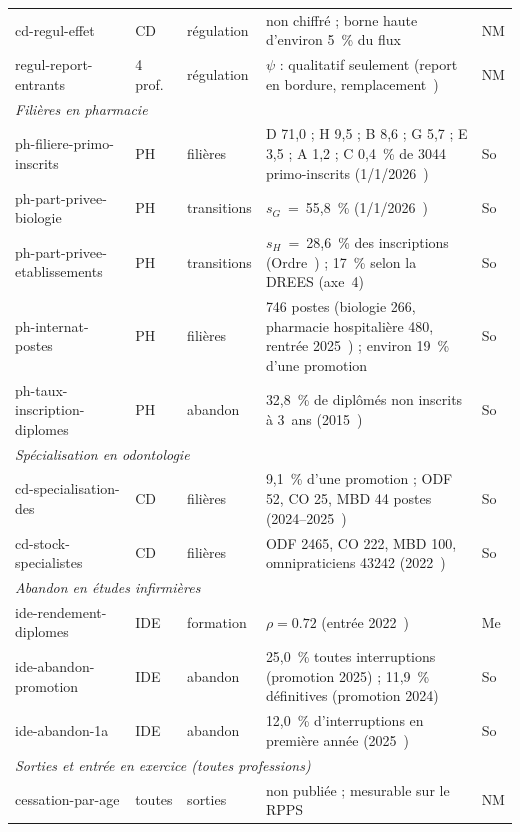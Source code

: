 \documentclass[11pt]{article}
\begin{document}
\begin{table}[p]
\begin{tabular}{p{2.6cm}p{1.1cm}p{1.6cm}p{6.6cm}p{0.5cm}}
cd-regul-effet & CD & régulation & non chiffré ; borne haute d'environ 5~\%\derive{} du flux & NM \\
regul-report-entrants & 4 prof. & régulation & $\psi$ : qualitatif seulement (report en bordure, remplacement~\cite{irdes270,ccomptes2024}) & NM \\
\midrule
\multicolumn{5}{l}{\emph{Filières en pharmacie}} \\
ph-filiere-primo-inscrits & PH & filières & D 71,0 ; H 9,5 ; B 8,6 ; G 5,7 ; E 3,5 ; A 1,2 ; C 0,4~\% de \num{3044} primo-inscrits (1/1/2026~\cite{cnop2025}) & So \\
ph-part-privee-biologie & PH & transitions & $s_G$~=~55,8~\%\derive{} (1/1/2026~\cite{cnop2025}) & So \\
ph-part-privee-etablissements & PH & transitions & $s_H$~=~28,6~\%\derive{} des inscriptions (Ordre~\cite{cnop2025}) ; 17~\% selon la DREES (axe~4) & So \\
ph-internat-postes & PH & filières & \num{746} postes (biologie \num{266}, pharmacie hospitalière \num{480}, rentrée 2025~\cite{arrete2024pharma}) ; environ 19~\%\derive{} d'une promotion & So \\
ph-taux-inscription-diplomes & PH & abandon & 32,8~\% de diplômés non inscrits à 3~ans (2015~\cite{cnop2016}) & So \\
\midrule
\multicolumn{5}{l}{\emph{Spécialisation en odontologie}} \\
cd-specialisation-des & CD & filières & 9,1~\%\derive{} d'une promotion ; ODF 52, CO 25, MBD 44 postes (2024--2025~\cite{arrete2024odonto}) & So \\
cd-stock-specialistes & CD & filières & ODF \num{2465}, CO \num{222}, MBD \num{100}, omnipraticiens \num{43242} (2022~\cite{oncd2022}) & So \\
\midrule
\multicolumn{5}{l}{\emph{Abandon en études infirmières}} \\
ide-rendement-diplomes & IDE & formation & $\rho = \num{0.72}$\mesure{} (entrée 2022~\cite{drees491}) & Me \\
ide-abandon-promotion & IDE & abandon & 25,0~\% toutes interruptions (promotion 2025) ; 11,9~\% définitives (promotion 2024)~\cite{drees491} & So \\
ide-abandon-1a & IDE & abandon & 12,0~\% d'interruptions en première année (2025~\cite{drees491}) & So \\
\midrule
\multicolumn{5}{l}{\emph{Sorties et entrée en exercice (toutes professions)}} \\
cessation-par-age & toutes & sorties & non publiée ; mesurable sur le RPPS & NM \\

\end{tabular}
\end{table}
\end{document}
